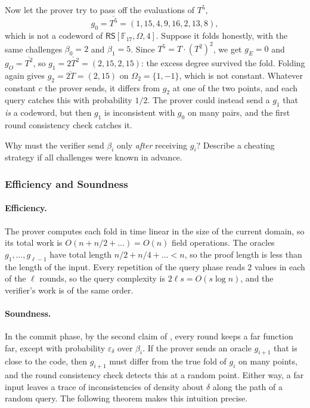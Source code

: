 \documentclass[../../book]{subfiles}
\begin{document}
\begin{example}\label{ex:fri-cheat}
    Now let the prover try to pass off the evaluations of $T^5$,
    \begin{equation*}
        g_0 = \overline{T^5} = (1, 15, 4, 9, 16, 2, 13, 8),
    \end{equation*}
    which is not a codeword of $\mathsf{RS}[\mathbb{F}_{17}, \Omega, 4]$.
    Suppose it folds honestly, with the same challenges $\beta_0 = 2$ and $\beta_1 = 5$.
    Since $T^5 = T \cdot (T^2)^2$, we get $g_E = 0$ and $g_O = \overline{T^2}$, so $g_1 = \overline{2T^2} = (2, 15, 2, 15)$: the excess degree survived the fold.
    Folding again gives $g_2 = \overline{2T} = (2, 15)$ on $\Omega_2 = \{1, -1\}$, which is not constant.
    Whatever constant $c$ the prover sends, it differs from $g_2$ at one of the two points, and each query catches this with probability $1/2$.
    The prover could instead send a $g_1$ that \emph{is} a codeword, but then $g_1$ is inconsistent with $g_0$ on many pairs, and the first round consistency check catches it.
\end{example}

\begin{exercise}
    Why must the verifier send $\beta_i$ only \emph{after} receiving $g_i$? Describe a cheating strategy if all challenges were known in advance.
\end{exercise}

\subsubsection{Efficiency and Soundness}\label{subsubsec:fri-soundness}

\paragraph{Efficiency.}
The prover computes each fold in time linear in the size of the current domain, so its total work is $O(n + n/2 + \dots) = O(n)$ field operations.
The oracles $g_1, \dots, g_{\ell-1}$ have total length $n/2 + n/4 + \dots < n$, so the proof length is less than the length of the input.
Every repetition of the query phase reads $2$ values in each of the $\ell$ rounds, so the query complexity is $2\ell s = O(s \log n)$, and the verifier's work is of the same order.

\paragraph{Soundness.}
In the commit phase, by the second claim of , every round keeps a far function far, except with probability $\varepsilon_\delta$ over $\beta_i$.
If the prover sends an oracle $g_{i+1}$ that is close to the code, then $g_{i+1}$ must differ from the true fold of $g_i$ on many points, and the round consistency check detects this at a random point.
Either way, a far input leaves a trace of inconsistencies of density about $\delta$ along the path of a random query.
The following theorem makes this intuition precise.
\end{document}

